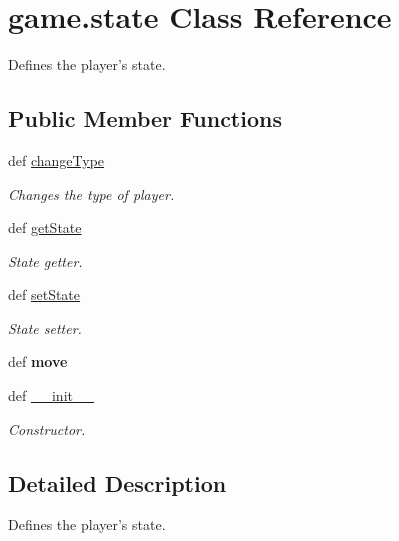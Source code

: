 \hypertarget{classgame_1_1state}{
\section{game.state Class Reference}
\label{classgame_1_1state}
}


Defines the player's state.  


\subsection*{Public Member Functions}
\begin{DoxyCompactItemize}
\item 
def \hyperlink{classgame_1_1state_ae280c587f361655d8b8a64645dd46e3e}{changeType}
\begin{DoxyCompactList}\small\item\em Changes the type of player. \item\end{DoxyCompactList}\item 
def \hyperlink{classgame_1_1state_a568cdba2815170a28cf7ec2547997e64}{getState}
\begin{DoxyCompactList}\small\item\em State getter. \item\end{DoxyCompactList}\item 
def \hyperlink{classgame_1_1state_a15a24438cb708f1458d8688f878318be}{setState}
\begin{DoxyCompactList}\small\item\em State setter. \item\end{DoxyCompactList}\item 
\hypertarget{classgame_1_1state_a8bb5475c73a1327f02ef53452de7d5ae}{
def {\bfseries move}}
\label{classgame_1_1state_a8bb5475c73a1327f02ef53452de7d5ae}

\item 
def \hyperlink{classgame_1_1state_aab1e3d8ecaf95966b3f0a6f818154f31}{\_\-\_\-init\_\-\_\-}
\begin{DoxyCompactList}\small\item\em Constructor. \item\end{DoxyCompactList}\end{DoxyCompactItemize}


\subsection{Detailed Description}
Defines the player's state. 

